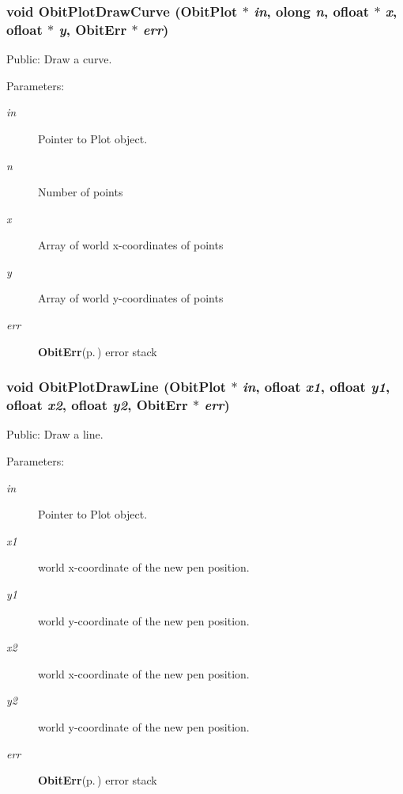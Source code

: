 \subsubsection{\setlength{\rightskip}{0pt plus 5cm}void Obit\-Plot\-Draw\-Curve ({\bf Obit\-Plot} $\ast$ {\em in}, {\bf olong} {\em n}, {\bf ofloat} $\ast$ {\em x}, {\bf ofloat} $\ast$ {\em y}, {\bf Obit\-Err} $\ast$ {\em err})}\label{ObitPlot_8h_a26}


Public: Draw a curve. 

\begin{Desc}
\item[Parameters:]
\begin{description}
\item[{\em in}]Pointer to Plot object. \item[{\em n}]Number of points \item[{\em x}]Array of world x-coordinates of points \item[{\em y}]Array of world y-coordinates of points \item[{\em err}]{\bf Obit\-Err}{\rm (p.\,\pageref{structObitErr})} error stack \end{description}
\end{Desc}
\subsubsection{\setlength{\rightskip}{0pt plus 5cm}void Obit\-Plot\-Draw\-Line ({\bf Obit\-Plot} $\ast$ {\em in}, {\bf ofloat} {\em x1}, {\bf ofloat} {\em y1}, {\bf ofloat} {\em x2}, {\bf ofloat} {\em y2}, {\bf Obit\-Err} $\ast$ {\em err})}\label{ObitPlot_8h_a25}


Public: Draw a line. 

\begin{Desc}
\item[Parameters:]
\begin{description}
\item[{\em in}]Pointer to Plot object. \item[{\em x1}]world x-coordinate of the new pen position. \item[{\em y1}]world y-coordinate of the new pen position. \item[{\em x2}]world x-coordinate of the new pen position. \item[{\em y2}]world y-coordinate of the new pen position. \item[{\em err}]{\bf Obit\-Err}{\rm (p.\,\pageref{structObitErr})} error stack \end{description}
\end{Desc}

